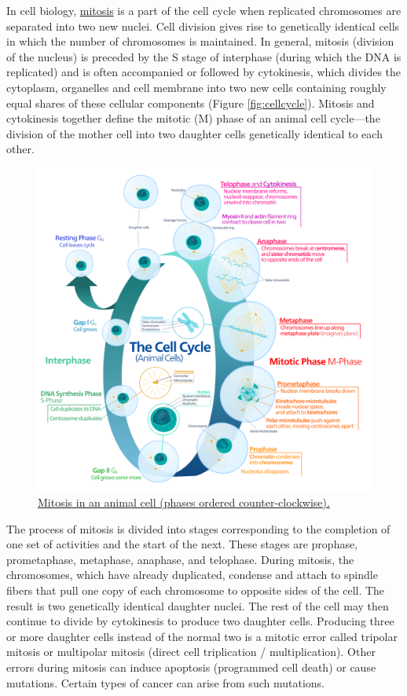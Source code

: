 In cell biology, \href{https://en.wikipedia.org/wiki/Mitosis}{mitosis} is a part of the cell cycle when replicated chromosomes are separated into two new nuclei. Cell division gives rise to genetically identical cells in which the number of chromosomes is maintained. In general, mitosis (division of the nucleus) is preceded by the S stage of interphase (during which the DNA is replicated) and is often accompanied or followed by cytokinesis, which divides the cytoplasm, organelles and cell membrane into two new cells containing roughly equal shares of these cellular components (Figure \ref{fig:cellcycle}). Mitosis and cytokinesis together define the mitotic (M) phase of an animal cell cycle---the division of the mother cell into two daughter cells genetically identical to each other.



\begin{figure}

{\centering \includegraphics[width=0.7\linewidth]{./figures/reproduction/Animal_cell_cycle-en} 

}

\caption{\href{https://commons.wikimedia.org/wiki/File:Animal_cell_cycle-en.svg}{Mitosis in an animal cell (phases ordered counter-clockwise).}}\label{fig:cellcyclefigure}
\end{figure}

The process of mitosis is divided into stages corresponding to the completion of one set of activities and the start of the next. These stages are prophase, prometaphase, metaphase, anaphase, and telophase. During mitosis, the chromosomes, which have already duplicated, condense and attach to spindle fibers that pull one copy of each chromosome to opposite sides of the cell. The result is two genetically identical daughter nuclei. The rest of the cell may then continue to divide by cytokinesis to produce two daughter cells. Producing three or more daughter cells instead of the normal two is a mitotic error called tripolar mitosis or multipolar mitosis (direct cell triplication / multiplication). Other errors during mitosis can induce apoptosis (programmed cell death) or cause mutations. Certain types of cancer can arise from such mutations.




